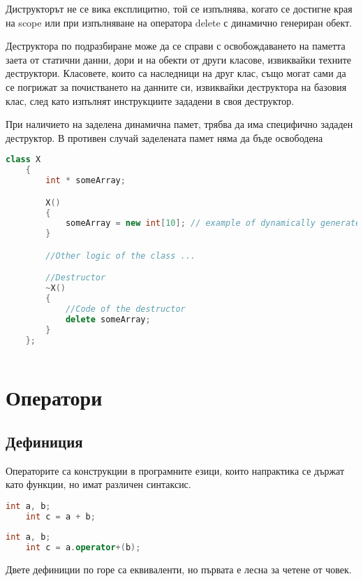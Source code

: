 \documentclass[fleqn,12pt]{article}
\begin{document}
Диструкторът не се вика експлицитно, той се изпълнява, когато се достигне края на scope или при изпълняване на оператора delete с динамично генериран обект. 

Деструктора по подразбиране може да се справи с освобождаването на паметта заета от статични данни, дори и на обекти от други класове, извиквайки техните деструктори. Класовете, които са наследници на друг клас, също могат сами да се погрижат за почистването на данните си, извиквайки деструктора на базовия клас, след като изпълнят инструкциите зададени в своя деструктор.

При наличието на заделена динамична памет, трябва да има специфично зададен деструктор. В противен случай заделената памет няма да бъде освободена

\begin{lstlisting}[language=C++, caption=Example custom destructor]
    class X
    {
        int * someArray;

        X() 
        {
            someArray = new int[10]; // example of dynamically generated memory
        }

        //Other logic of the class ...

        //Destructor
        ~X()
        {
            //Code of the destructor
            delete someArray;
        }
    };
    
\end{lstlisting}


\section{Оператори}
\subsection{Дефиниция}
Операторите са конструкции в програмните езици, които напрактика се държат като функции, но имат различен синтаксис. 

\begin{lstlisting}[language=C++, caption=Example use of operators]
    int a, b;
    int c = a + b;
\end{lstlisting}

\begin{lstlisting}[language=C++, caption=Equivalent use of operators]
    int a, b;
    int c = a.operator+(b);
\end{lstlisting}

Двете дефиниции по горе са еквиваленти, но първата е лесна за четене от човек.
\end{document}
